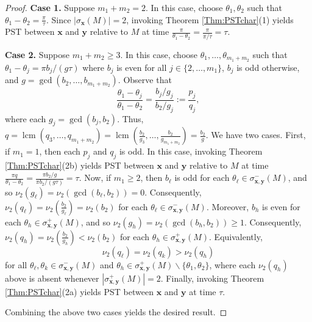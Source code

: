 \documentclass[10pt,a4paper]{amsart}
\newcommand{\bx}{\mathbf x}
\newcommand{\by}{\mathbf y}
\begin{document}
\begin{proof}
\noindent \textbf{Case 1.} Suppose $m_1+m_2=2$. In this case, choose $\theta_1,\theta_2$ such that $\theta_1-\theta_2=\frac{\pi}{\tau}$. Since $|\sigma_{\bx}(M)|=2$, invoking Theorem \ref{Thm:PSTchar}(1) yields PST between $\bx$ and $\by$ relative to $M$ at time $\frac{\pi}{\theta_1-\theta_2}=\frac{\pi}{\pi/\tau}=\tau$.

\noindent \textbf{Case 2.} Suppose $m_1+m_2\geq 3$. In this case, choose $\theta_1,\ldots,\theta_{m_1+m_2}$ such that $\theta_1-\theta_j=\pi b_j/(g\tau)$ where $b_j$ is even for all $j\in\{2,\ldots,m_1\}$, $b_j$ is odd otherwise, and $g=\operatorname{gcd}(b_2,\ldots,b_{m_1+m_2})$. Observe that
\begin{equation}
\label{Eq:PST}
\frac{\theta_1-\theta_j}{\theta_1-\theta_2}=\frac{b_j/g_j}{b_2/g_j}:=\frac{p_j}{q_j},
\end{equation}
where each $g_j=\operatorname{gcd}(b_j,b_2)$.
Thus, $q=\operatorname{lcm}(q_3,\ldots,q_{m_1+m_2})=\operatorname{lcm}(\frac{b_2}{g_3},\ldots,\frac{b_2}{g_{m_1+m_2}})=\frac{b_2}{g}$. We have two cases. First, if $m_1=1$, then each $p_j$ and $q_j$ is odd. In this case, invoking Theorem \ref{Thm:PSTchar}(2b) yields PST between $\bx$ and $\by$ relative to $M$ at time $\frac{\pi q}{\theta_1-\theta_2}=\frac{\pi b_2/g}{\pi b_2/ (g\tau)}=\tau$. Now, if $m_1\geq 2$, then $b_{\ell}$ is odd for each $\theta_{\ell}\in\sigma_{\bx,\by}^-(M)$, and so $\nu_2(g_{\ell})=\nu_2(\operatorname{gcd}(b_{\ell},b_2))=0$. Consequently,  $\nu_2(q_{\ell})=\nu_2(\frac{b_2}{g_{\ell}})=\nu_2(b_2)$ for each $\theta_{\ell}\in\sigma_{\bx,\by}^-(M)$. Moreover, $b_{h}$ is even for each $\theta_{h}\in\sigma_{\bx,\by}^+(M)$, and so $\nu_2(g_{h})=\nu_2(\operatorname{gcd}(b_{h},b_2))\geq 1$. Consequently,  $\nu_2(q_{h})=\nu_2(\frac{b_2}{g_{h}})<\nu_2(b_2)$ for each $\theta_{h}\in\sigma_{\bx,\by}^+(M)$. Equivalently, $$\nu_2(q_{\ell})=\nu_2(q_{k})>\nu_2(q_h)$$ for all $\theta_{\ell},\theta_k\in \sigma_{\bx,\by}^-(M)$ and $\theta_h\in \sigma_{\bx,\by}^+(M)\backslash\{\theta_1,\theta_2\}$, where each $\nu_2(q_h)$ above is absent whenever $|\sigma_{\bx,\by}^+(M)|=2$. Finally, invoking Theorem \ref{Thm:PSTchar}(2a) yields PST between $\bx$ and $\by$ at time $\tau$.

Combining the above two cases yields the desired result.
\end{proof}
\end{document}
